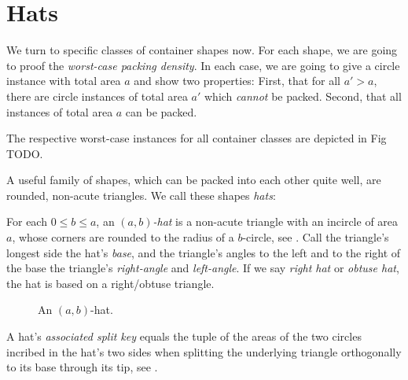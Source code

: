 \documentclass[a4paper,style=print,bibliography=totoc,nexus,lnum,extramargin]{tubsbook}
\begin{document}
\section{Hats}

We turn to specific classes of container shapes now. For each shape, we are going to proof the \emph{worst-case packing density}. In each case, we are going to give a circle instance with total area $a$ and show two properties: First, that for all $a' > a$, there are circle instances of total area $a'$ which \emph{cannot} be packed. Second, that all instances of total area $a$ can be packed.

The respective worst-case instances for all container classes are depicted in Fig TODO.

A useful family of shapes, which can be packed into each other quite well, are rounded, non-acute triangles. We call these shapes \emph{hats}:

\begin{definition}
    For each $0 \le b \le a$, an \emph{$(a,b)$-hat} is a non-acute triangle with an incircle of area $a$, whose corners are rounded to the radius of a $b$-circle, see . Call the triangle's longest side the hat's \emph{base}, and the triangle's angles to the left and to the right of the base the triangle's \emph{right-angle} and \emph{left-angle}.
    If we say \emph{right hat} or \emph{obtuse hat}, the hat is based on a right/obtuse triangle.
\end{definition}

\newcommand\defaulta{30}
\newcommand\defaultb{40}
\newcommand\defaultr{0.2}
\newcommand\defaultx{0.6}

\begin{figure}[htbp!]
    \centering


    \caption{An $(a,b)$-hat.}
    \label{fig:hat}
\end{figure}

\begin{definition}\label{def:hat-split-key}
    A hat's \emph{associated split key} equals the tuple of the areas of the two circles incribed in the hat's two sides when splitting the underlying triangle orthogonally to its base through its tip, see .
\end{definition}
\end{document}
